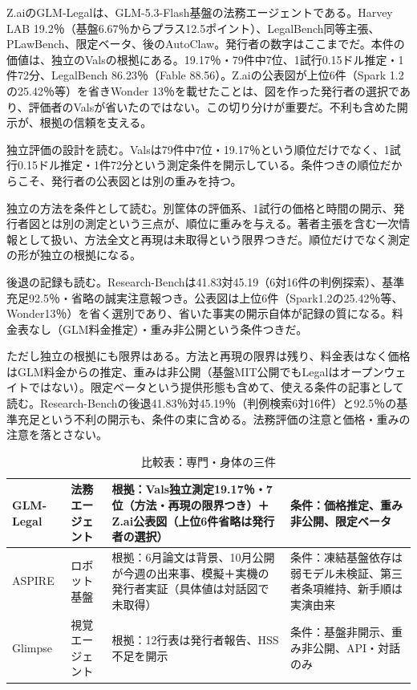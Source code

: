 \documentclass[lualatex,a4paper,10pt]{jlreq}
\begin{document}
Z.aiのGLM-Legalは、GLM-5.3-Flash基盤の法務エージェントである。Harvey LAB 19.2％（基盤6.67％からプラス12.5ポイント）、LegalBench同等主張、PLawBench、限定ベータ、後のAutoClaw。発行者の数字はここまでだ。本件の価値は、独立のValsの根拠にある。19.17％・79件中7位、1試行0.15ドル推定・1件72分、LegalBench 86.23％（Fable 88.56）。Z.aiの公表図が上位6件（Spark 1.2の25.42％等）を省きWonder 13％を載せたことは、図を作った発行者の選択であり、評価者のValsが省いたのではない。この切り分けが重要だ。不利も含めた開示が、根拠の信頼を支える。
\cite{B55,B53,B54}


独立評価の設計を読む。Valsは79件中7位・19.17％という順位だけでなく、1試行0.15ドル推定・1件72分という測定条件を開示している。条件つきの順位だからこそ、発行者の公表図とは別の重みを持つ。
\cite{B55,B53,B54}


独立の方法を条件として読む。別筐体の評価系、1試行の価格と時間の開示、発行者図とは別の測定という三点が、順位に重みを与える。著者主張を含む一次情報として扱い、方法全文と再現は未取得という限界つきだ。順位だけでなく測定の形が独立の根拠になる。
\cite{B55,B53,B54}


後退の記録も読む。Research-Benchは41.83対45.19（6対16件の判例探索）、基準充足92.5％・省略の誠実注意報つき。公表図は上位6件（Spark1.2の25.42％等、Wonder13％）を省く選別であり、省いた事実の開示自体が記録の質になる。料金表なし（GLM料金推定）・重み非公開という条件つきだ。
\cite{B55,B53,B54}


ただし独立の根拠にも限界はある。方法と再現の限界は残り、料金表はなく価格はGLM料金からの推定、重みは非公開（基盤MIT公開でもLegalはオープンウェイトではない）。限定ベータという提供形態も含めて、使える条件の記事として読む。Research-Benchの後退41.83％対45.19％（判例検索6対16件）と92.5％の基準充足という不利の開示も、条件の束に含める。法務評価の注意と価格・重みの注意を落とさない。
\cite{B55,B53,B54}

\begin{table}[htbp]\centering\footnotesize
\caption{比較表：専門・身体の三件}
\begin{tabularx}{0.96\linewidth}{@{}lXXX@{}}
\toprule
GLM-Legal & 法務エージェント & 根拠：Vals独立測定19.17％・7位（方法・再現の限界つき）＋Z.ai公表図（上位6件省略は発行者の選択） & 条件：価格推定、重み非公開、限定ベータ \cite{B55,B53,B54} \\
\midrule
ASPIRE & ロボット基盤 & 根拠：6月論文は背景、10月公開が今週の出来事、模擬＋実機の発行者実証（具体値は対話図で未取得） & 条件：凍結基盤依存は弱モデル未検証、第三者条項維持、新手順は実演由来 \cite{B57,B56,B89} \\
\midrule
Glimpse & 視覚エージェント & 根拠：12行表は発行者報告、HSS不足を開示 & 条件：基盤非開示、重み非公開、API・対話のみ \cite{B58,B59,B88} \\
\bottomrule
\end{tabularx}
\end{table}
\end{document}
